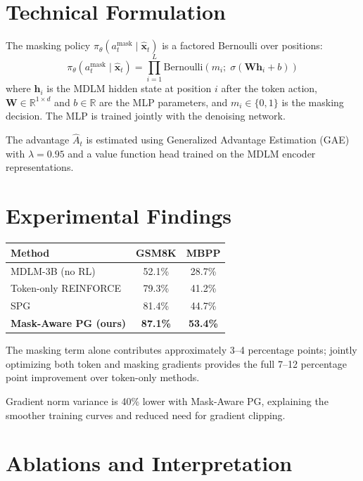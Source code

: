 \documentclass[10pt,twocolumn]{article}
\begin{document}
\section{Technical Formulation}

The masking policy $\pi_\theta(a^{\text{mask}}_t \mid \hat{\mathbf{x}}_t)$
is a factored Bernoulli over positions:
\[
\pi_\theta(a^{\text{mask}}_t \mid \hat{\mathbf{x}}_t)
= \prod_{i=1}^{L} \text{Bernoulli}\!\left(m_i;\; \sigma(\mathbf{W}
  \mathbf{h}_i + b)\right)
\]
where $\mathbf{h}_i$ is the MDLM hidden state at position $i$ after
the token action, $\mathbf{W} \in \mathbb{R}^{1 \times d}$ and
$b \in \mathbb{R}$ are the MLP parameters, and $m_i \in \{0, 1\}$
is the masking decision. The MLP is trained jointly with the
denoising network.

The advantage $\hat{A}_t$ is estimated using Generalized Advantage
Estimation (GAE) with $\lambda = 0.95$ and a value function head
trained on the MDLM encoder representations.

\section{Experimental Findings}

\begin{center}
\small
\begin{tabular}{lcc}
\toprule
Method & GSM8K & MBPP \\
\midrule
MDLM-3B (no RL) & 52.1\% & 28.7\% \\
Token-only REINFORCE & 79.3\% & 41.2\% \\
SPG & 81.4\% & 44.7\% \\
\textbf{Mask-Aware PG (ours)} & \textbf{87.1\%} & \textbf{53.4\%} \\
\bottomrule
\end{tabular}
\end{center}

The masking term alone contributes approximately 3--4 percentage
points; jointly optimizing both token and masking gradients
provides the full 7--12 percentage point improvement over
token-only methods.

Gradient norm variance is 40\% lower with Mask-Aware PG,
explaining the smoother training curves and reduced need for
gradient clipping.

\section{Ablations and Interpretation}
\end{document}
